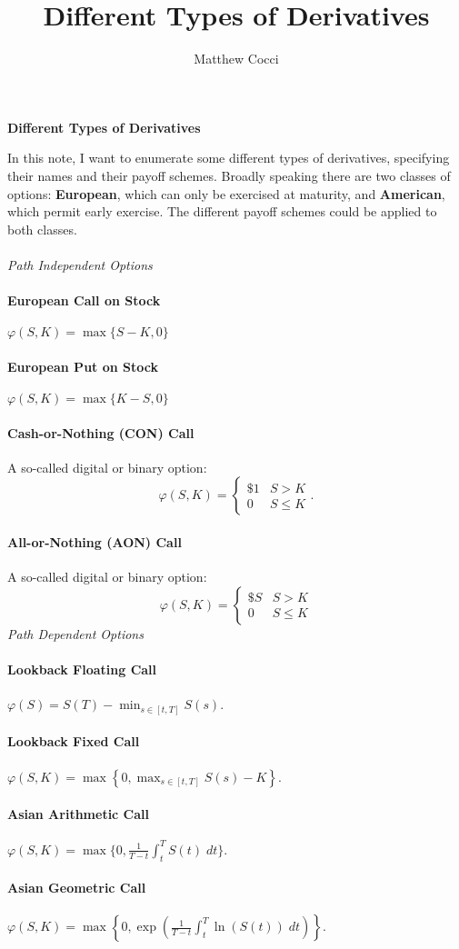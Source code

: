 \documentclass[a4paper,12pt]{scrartcl}
\author{Matthew Cocci}
\title{Different Types of Derivatives}
\date{}
\begin{document}
\begin{center}
   \LARGE
   \textbf{Different Types of Derivatives}
\end{center}
In this note, I want to enumerate some different types of derivatives,
specifying their names and their payoff schemes. Broadly speaking
there are two classes of options: \textbf{European}, which can only
be exercised at maturity, and \textbf{American}, which permit early
exercise.  The different payoff schemes could be applied to both
classes.
\\
\\
{\sl \large Path Independent Options}

\paragraph{European Call on Stock} 
$\varphi(S,K) = \max\{ S-K, 0 \}$

\paragraph{European Put on Stock} 
$\varphi(S,K) = \max\{ K-S, 0 \}$

\paragraph{Cash-or-Nothing (CON) Call} A so-called digital or binary 
option:
\[\varphi(S,K) = \begin{cases} \$1 & S>K \\ 0 & S \leq K\end{cases}.\]


\paragraph{All-or-Nothing (AON) Call} A so-called digital or binary 
option:
   \[\varphi(S,K) = \begin{cases} \$S & S>K \\ 0 & S \leq K\end{cases}\]
{\sl \large Path Dependent Options}

\paragraph{Lookback Floating Call} $\varphi(S) = 
S(T) - \min_{s \in [t,T]} S(s)$.

\paragraph{Lookback Fixed Call} $\varphi(S,K) = \max\left\{ 0, 
   \max_{s \in [t,T]} S(s) - K \right\}$.

\paragraph{Asian Arithmetic Call} $\varphi(S,K) = \max\{0,
   \frac{1}{T-t} \int_t^T S(t) \; dt \}$.

\paragraph{Asian Geometric Call} $\varphi(S,K) = \max\left\{0,
   \exp\left(\frac{1}{T-t} \int_t^T \ln(S(t)) \; dt \right)\right\}$.
\end{document}
